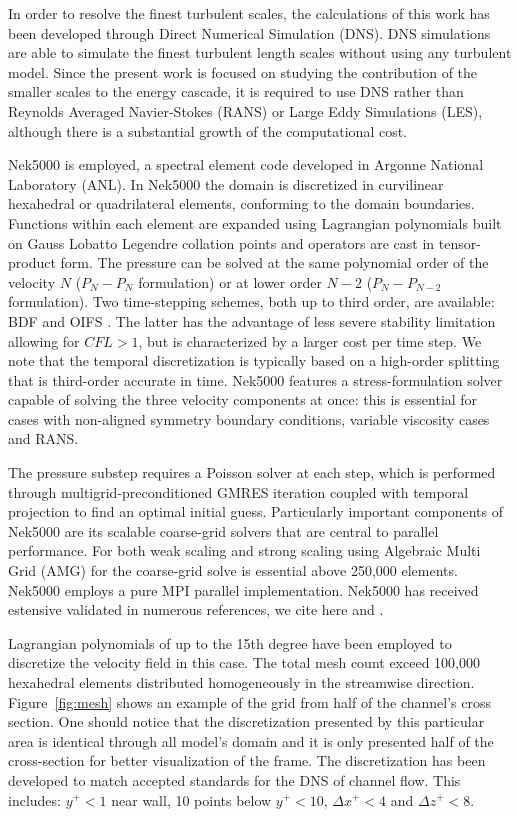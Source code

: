 \documentclass[twocolumn,10pt]{asme2e}
\begin{document}
In order to resolve the finest turbulent scales, the calculations of this work has been developed through Direct Numerical Simulation (DNS).
DNS simulations are able to simulate the finest turbulent length scales without using any turbulent model. Since the present work is focused on studying the contribution of the smaller scales to the energy cascade, it is required to use DNS rather than Reynolds Averaged Navier-Stokes (RANS) or Large Eddy Simulations (LES), although there is a substantial growth of the computational cost.

Nek5000 is employed, a spectral element code developed in Argonne National Laboratory (ANL).  In Nek5000 \cite{fischer2015nek5000} \cite{fischer1997} the domain is discretized in curvilinear hexahedral  or quadrilateral elements, conforming to the domain boundaries. Functions within each element are expanded using Lagrangian polynomials built on Gauss Lobatto Legendre collation points and operators are cast in tensor-product form. The pressure can be solved at the same polynomial order of the velocity $N$ ($P_{N}-P_{N}$ formulation) or at lower order $N-2$ ($P_{N}-P_{N-2}$ formulation). Two time-stepping schemes, both up to third order, are available: BDF and OIFS \cite{fischer2003implementation}. The latter has the advantage of less severe stability limitation allowing for $CFL>1$, but is characterized by a larger cost per time step. We note that the temporal discretization is typically based on a high-order splitting that is third-order accurate in time.
Nek5000 features a stress-formulation solver capable of solving the three velocity components at once: this is essential for cases with non-aligned symmetry boundary conditions, variable viscosity cases and RANS.

The pressure substep requires a Poisson solver at each step, which is performed through multigrid-preconditioned GMRES iteration coupled with temporal projection to find an optimal initial guess. Particularly important components of Nek5000 are its scalable coarse-grid solvers that are central to parallel performance. For both weak scaling and strong scaling using Algebraic Multi Grid (AMG) for the coarse-grid solve is essential above 250,000 elements. Nek5000 employs a pure MPI parallel implementation. Nek5000 has received estensive validated in numerous references, we cite here \cite{merzari2013} and \cite{Obabko2011}.

Lagrangian polynomials of up to the 15th degree have been employed to discretize the velocity field in this case. The total mesh count exceed 100,000 hexahedral elements distributed homogeneously in the streamwise direction. Figure~\ref{fig:mesh} shows an example of the grid from half of the channel's cross section. One should notice that the discretization presented by this particular area is identical through all model's domain and it is only presented half of the cross-section for better visualization of the frame. The discretization has been developed  to match accepted standards for the DNS of channel flow. This includes: $y^{+}<1$ near wall, 10 points below $y^{+}<10$, $\Delta x^{+}<4$ and $\Delta z^{+}<8$.
\end{document}
